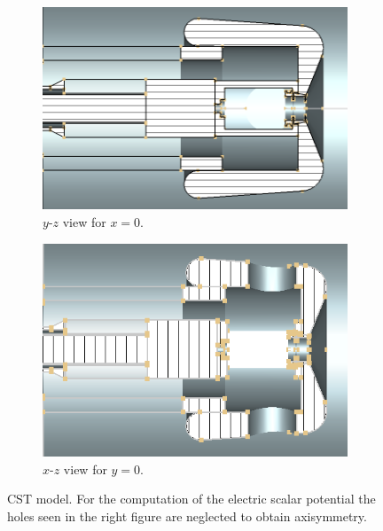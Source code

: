 \begin{center}
\begin{figure}[H]
   \begin{subfigure}{0.45\textwidth}
      \includegraphics[width=\textwidth]{figures/200kV/png/v1_cutx}
      \caption{$y$-$z$ view for $x=0$.}
      \label{fig:cst_geometry_yz}
   \end{subfigure}
   \begin{subfigure}{0.45\textwidth}
      \includegraphics[width=\textwidth]{figures/200kV/png/v1_cuty}
      \caption{$x$-$z$ view for $y=0$.}
      \label{fig:cst_geometry_xz}
   \end{subfigure}
   \caption{CST model. For the computation of the electric scalar potential the holes seen in the right figure are neglected to obtain axisymmetry.}
\end{figure}
\end{center}

